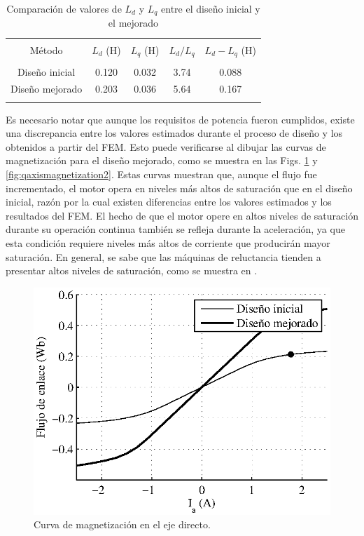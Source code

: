 \begin{table}[btp]
\centering
\caption{Comparación de valores de $L_d$ y $L_q$ entre el diseño inicial y el mejorado}
\label{table:improvedinductanceresults}
\begin{tabular}{c c c c c}
\hline\hline\\
Método & $L_d$ (H) & $L_q$ (H) & $L_d/L_q$ & $L_d-L_q$ (H)\\
\hline\\
Diseño inicial & 0.120 & 0.032 & 3.74 & 0.088\\
Diseño mejorado & 0.203 & 0.036 & 5.64 & 0.167\\
\hline\hline\\
\end{tabular}
\end{table}

Es necesario notar que aunque los requisitos de potencia fueron cumplidos, existe una discrepancia entre los valores estimados durante el proceso de diseño y los obtenidos a partir del FEM. Esto puede verificarse al dibujar las curvas de magnetización para el diseño mejorado, como se muestra en las Figs. \ref{fig:daxismagnetization2} y \ref{fig:qaxismagnetization2}. Estas curvas muestran que, aunque el flujo fue incrementado, el motor opera en niveles más altos de saturación que en el diseño inicial, razón por la cual existen diferencias entre los valores estimados y los resultados del FEM. El hecho de que el motor opere en altos niveles de saturación durante su operación continua también se refleja durante la aceleración, ya que esta condición requiere niveles más altos de corriente que producirán mayor saturación. En general, se sabe que las máquinas de reluctancia tienden a presentar altos niveles de saturación, como se muestra en \cite{agarlita2012,boldea2015}.

\begin{figure}[hbtp]
\centering
\includegraphics[scale=1]{../img/Desarrollo_de_un_diseno_inicial/daxismagnetization2.eps}
\caption{Curva de magnetización en el eje directo.}
\label{fig:daxismagnetization2}
\end{figure}

